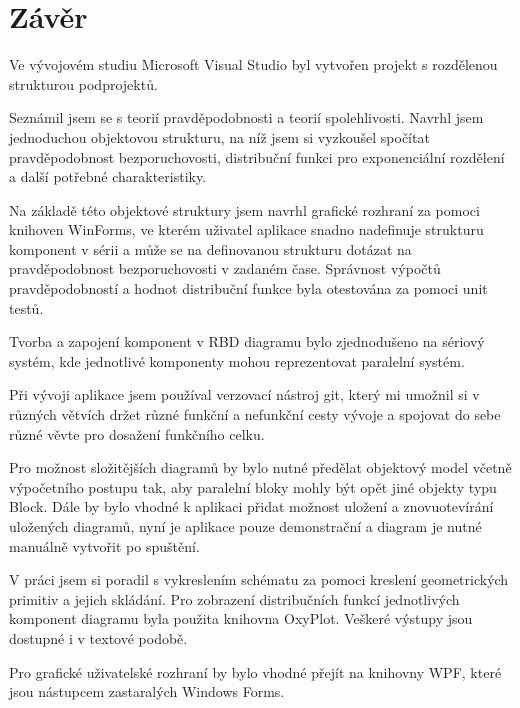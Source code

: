 \documentclass[FM,RP]{tulthesis}
\begin{document}
\chapter{Závěr}
    Ve vývojovém studiu Microsoft Visual Studio byl vytvořen projekt s rozdělenou strukturou podprojektů.

    Seznámil jsem se s teorií pravděpodobnosti a teorií spolehlivosti.
    Navrhl jsem jednoduchou objektovou strukturu, na níž jsem si vyzkoušel spočítat pravděpodobnost bezporuchovosti, 
    distribuční funkci pro exponenciální rozdělení a další potřebné charakteristiky.

    Na základě této objektové struktury jsem navrhl grafické rozhraní za pomoci knihoven WinForms, 
    ve kterém uživatel aplikace snadno nadefinuje strukturu komponent v sérii a může se na definovanou strukturu dotázat
    na pravděpodobnost bezporuchovosti v zadaném čase. Správnost výpočtů pravděpodobností a hodnot distribuční funkce byla otestována za pomoci unit testů.

    Tvorba a zapojení komponent v RBD diagramu bylo zjednodušeno na sériový systém, kde jednotlivé komponenty mohou reprezentovat paralelní systém.

    Při vývoji aplikace jsem používal verzovací nástroj git, který mi umožnil si v různých větvích držet různé funkční a nefunkční cesty vývoje a spojovat do sebe různé
    věvte pro dosažení funkčního celku. \cite{7}

    Pro možnost složitějších diagramů by bylo nutné předělat objektový model včetně výpočetního postupu tak, aby paralelní bloky mohly být opět jiné objekty typu Block.
    Dále by bylo vhodné k aplikaci přidat možnost uložení a znovuotevírání uložených diagramů,
    nyní je aplikace pouze demonstrační a diagram je nutné manuálně vytvořit po spuštění.

    V práci jsem si poradil s vykreslením schématu za pomoci kreslení geometrických primitiv a jejich skládání. 
    Pro zobrazení distribučních funkcí jednotlivých komponent diagramu byla použita knihovna OxyPlot.
    Veškeré výstupy jsou dostupné i v textové podobě.

    Pro grafické uživatelské rozhraní by bylo vhodné přejít na knihovny WPF, které jsou nástupcem zastaralých Windows Forms.
\end{document}
